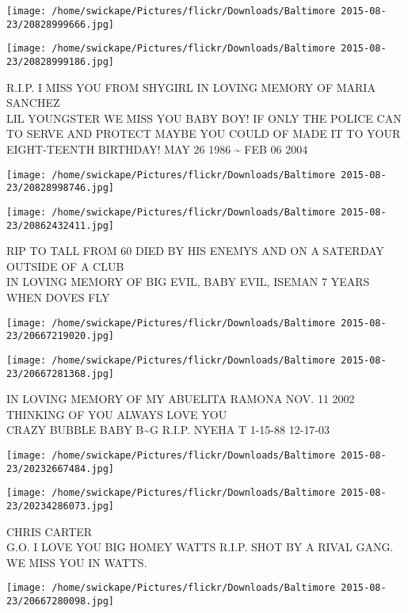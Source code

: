 \documentclass[10pt,letterpaper]{article}
\begin{document}
\texttt{[image: /home/swickape/Pictures/flickr/Downloads/Baltimore 2015-08-23/20828999666.jpg]}

\vspace{0.25in}
\texttt{[image: /home/swickape/Pictures/flickr/Downloads/Baltimore 2015-08-23/20828999186.jpg]}

R.I.P. I MISS YOU FROM SHYGIRL IN LOVING MEMORY OF MARIA SANCHEZ\\
LIL YOUNGSTER WE MISS YOU BABY BOY!  IF ONLY THE POLICE CAN TO SERVE AND PROTECT MAYBE YOU COULD OF MADE IT TO YOUR EIGHT{-}TEENTH BIRTHDAY!  MAY 26 1986 \textasciitilde{} FEB 06 2004
\pagebreak

\texttt{[image: /home/swickape/Pictures/flickr/Downloads/Baltimore 2015-08-23/20828998746.jpg]}

\vspace{0.25in}
\texttt{[image: /home/swickape/Pictures/flickr/Downloads/Baltimore 2015-08-23/20862432411.jpg]}

RIP TO TALL FROM 60 DIED BY HIS ENEMYS AND ON A SATERDAY OUTSIDE OF A CLUB\\
IN LOVING MEMORY OF BIG EVIL, BABY EVIL, ISEMAN 7 YEARS WHEN DOVES FLY
\pagebreak

\texttt{[image: /home/swickape/Pictures/flickr/Downloads/Baltimore 2015-08-23/20667219020.jpg]}

\vspace{0.25in}
\texttt{[image: /home/swickape/Pictures/flickr/Downloads/Baltimore 2015-08-23/20667281368.jpg]}

IN LOVING MEMORY OF MY ABUELITA RAMONA NOV. 11 2002 THINKING OF YOU ALWAYS LOVE YOU\\
CRAZY BUBBLE BABY B\textasciitilde{}G R.I.P. NYEHA T 1{-}15{-}88 12{-}17{-}03
\pagebreak

\texttt{[image: /home/swickape/Pictures/flickr/Downloads/Baltimore 2015-08-23/20232667484.jpg]}

\vspace{0.25in}
\texttt{[image: /home/swickape/Pictures/flickr/Downloads/Baltimore 2015-08-23/20234286073.jpg]}

CHRIS CARTER\\
G.O. I LOVE YOU BIG HOMEY WATTS R.I.P.  SHOT BY A RIVAL GANG.  WE MISS YOU IN WATTS.
\pagebreak

\texttt{[image: /home/swickape/Pictures/flickr/Downloads/Baltimore 2015-08-23/20667280098.jpg]}
\end{document}
